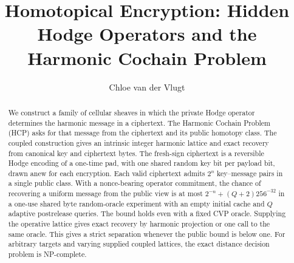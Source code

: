 \documentclass[11pt]{article}
\title{Homotopical Encryption: Hidden Hodge Operators and the Harmonic Cochain Problem}
\author{Chloe van der Vlugt}
\date{}
\begin{document}
\maketitle

\begin{abstract}
We construct a family of cellular sheaves in which the private Hodge
operator determines the harmonic message in a ciphertext. The Harmonic
Cochain Problem (HCP) asks for that message from the ciphertext and its
public homotopy class. The coupled construction gives an intrinsic integer
harmonic lattice and exact recovery from canonical key and ciphertext bytes.
The fresh-sign ciphertext is a reversible Hodge encoding of a one-time pad,
with one shared random key bit per payload bit, drawn anew for each
encryption. Each valid ciphertext admits
\(2^n\) key--message pairs in a single public class.
With a nonce-bearing operator commitment, the chance of recovering a uniform
message from the public view is at most \(2^{-n}+(Q+2)256^{-32}\) in a one-use
shared byte random-oracle experiment with an empty initial cache and \(Q\)
adaptive postrelease queries. The bound holds even with a fixed CVP oracle.
Supplying the operative lattice gives exact recovery by harmonic projection
or one call to the same oracle. This gives a strict separation whenever the
public bound is below one. For arbitrary targets and varying supplied
coupled lattices, the exact distance decision problem is NP-complete.
\end{abstract}

\setcounter{tocdepth}{1}
\tableofcontents
\clearpage









\clearpage


\end{document}
